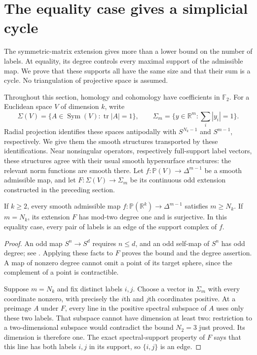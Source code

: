 \section{The equality case gives a simplicial cycle}
\label{sec:topology}

The symmetric-matrix extension gives more than a lower bound on the
number of labels.  At equality, its degree controls every maximal
support of the admissible map.  We prove that these supports all have
the same size and that their sum is a cycle.  No triangulation of
projective space is assumed.

Throughout this section, homology and cohomology have coefficients in
$\mathbb F_2$.  For a Euclidean space $V$ of
dimension $k$, write
\[
 \Sigma(V)=\{A\in\operatorname{Sym}(V):\operatorname{tr}|A|=1\},
 \qquad
 \Sigma_m=\{y\in\mathbb R^m:\textstyle\sum_i|y_i|=1\}.
\]
Radial projection identifies these spaces antipodally with
$S^{N_k-1}$ and $S^{m-1}$, respectively.  We give them the smooth
structures transported by these identifications.  Near nonsingular
operators, respectively full-support label vectors, these structures
agree with their usual smooth hypersurface structures: the relevant
norm functions are smooth there.  Let
$f:\mathbb P(V)\to\Delta^{m-1}$ be a smooth admissible map, and let
$F:\Sigma(V)\to\Sigma_m$ be its continuous odd extension constructed
in the preceding section.

\begin{proposition}\label{thm:label-bound}
If $k\ge2$, every smooth admissible map
$f:\mathbb P(\mathbb R^k)\to\Delta^{m-1}$ satisfies $m\ge N_k$.
If $m=N_k$, its extension $F$ has mod-two degree one and is
surjective.  In this equality case, every pair of labels is an edge
of the support complex of $f$.
\end{proposition}

\begin{proof}
An odd map $S^n\to S^d$ requires $n\le d$, and an odd self-map
of $S^n$ has odd degree; see \cite[Proposition~2B.6 and
Corollary~2B.7]{Hatcher2002}.  Applying these facts to $F$ proves the
bound and the degree assertion.  A map of nonzero degree cannot omit
a point of its target sphere, since the complement of a point is
contractible.

Suppose $m=N_k$ and fix distinct labels $i,j$.  Choose a vector in
$\Sigma_m$ with every coordinate nonzero, with precisely the
$i$th and $j$th coordinates positive.  At a preimage $A$ under $F$,
every line in the positive spectral subspace of $A$ uses only these
two labels.  That subspace cannot have dimension at least two:
restriction to a two-dimensional subspace would contradict the bound
$N_2=3$ just proved.  Its dimension is therefore one.  The exact
spectral-support property of $F$ says that this line has both
labels $i,j$ in its support, so $\{i,j\}$ is an edge.
\end{proof}

